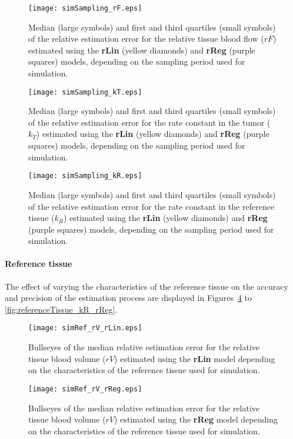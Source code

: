 \begin{figure}
\texttt{[image: simSampling\_rF.eps]}
\caption{Median (large symbols) and first and third quartiles (small symbols) of the relative estimation error for the relative tissue blood flow ($rF$) estimated using the \textbf{rLin} (yellow diamonds) and \textbf{rReg} (purple squares) models, depending on the sampling period used for simulation.}
\label{fig:sampling_rF}
\end{figure}

\begin{figure}
\texttt{[image: simSampling\_kT.eps]}
\caption{Median (large symbols) and first and third quartiles (small symbols) of the relative estimation error for the rate constant in the tumor ($k_T$) estimated using the \textbf{rLin} (yellow diamonds) and \textbf{rReg} (purple squares) models, depending on the sampling period used for simulation.}
\label{fig:sampling_kT}
\end{figure}

\begin{figure}
\texttt{[image: simSampling\_kR.eps]}
\caption{Median (large symbols) and first and third quartiles (small symbols) of the relative estimation error for the rate constant in the reference tissue ($k_R$) estimated using the \textbf{rLin} (yellow diamonds) and \textbf{rReg} (purple squares) models, depending on the sampling period used for simulation.}
\label{fig:sampling_kR}
\end{figure}

\paragraph{Reference tissue}
The effect of varying the characteristics of the reference tissue on the accuracy and precision of the estimation process are displayed in Figures~\ref{fig:referenceTissue_rV_rLin} to \ref{fig:referenceTissue_kR_rReg}. 

\begin{figure}
\texttt{[image: simRef\_rV\_rLin.eps]}
\caption{Bullseyes of the median relative estimation error for the relative tissue blood volume ($rV$) estimated using the \textbf{rLin} model depending on the characteristics of the reference tissue used for simulation.}
\label{fig:referenceTissue_rV_rLin}
\end{figure}

\begin{figure}
\texttt{[image: simRef\_rV\_rReg.eps]}
\caption{Bullseyes of the median relative estimation error for the relative tissue blood volume ($rV$) estimated using the \textbf{rReg} model depending on the characteristics of the reference tissue used for simulation.}
\label{fig:referenceTissue_rV_rReg}
\end{figure}

